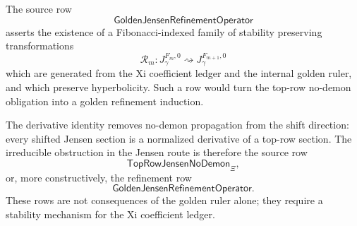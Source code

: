 \begin{definition}
\label{def:rh-golden-jensen-refinement-operator}
The source row
$$
\mathsf{GoldenJensenRefinementOperator}
$$
asserts the existence of a Fibonacci-indexed family of stability
preserving transformations
$$
\mathcal R_m:
J_{\gamma}^{F_m,0}
\rightsquigarrow
J_{\gamma}^{F_{m+1},0}
$$
which are generated from the Xi coefficient ledger and the internal
golden ruler, and which preserve hyperbolicity.  Such a row would turn
the top-row no-demon obligation into a golden refinement induction.
\end{definition}

\begin{principle}
\label{prin:rh-top-row-jensen-obstruction}
The derivative identity removes no-demon propagation from the shift
direction: every shifted Jensen section is a normalized derivative of a
top-row section.  The irreducible obstruction in the Jensen route is
therefore the source row
$$
\mathsf{TopRowJensenNoDemon}_{\Xi},
$$
or, more constructively, the refinement row
$$
\mathsf{GoldenJensenRefinementOperator}.
$$
These rows are not consequences of the golden ruler alone; they require
a stability mechanism for the Xi coefficient ledger.
\end{principle}

